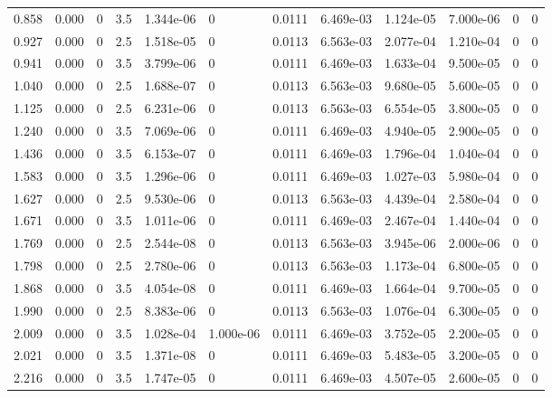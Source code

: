 \documentclass[preview]{standalone}
\begin{document}
{{\begin{tabular}{L{1.2cm}C{1.2cm} C{0.3cm}C{0.5cm} C{1.4cm}C{1.4cm} C{1.4cm}C{1.4cm} C{1.6cm}C{1.6cm} C{1.6cm}C{1.6cm}}
  0.858  &  0.000  & 0     & 3.5 &  1.344e-06  & 0  &  0.0111&   6.469e-03& 1.124e-05 & 7.000e-06   &  0 & 0  \\ 
  0.927  &  0.000  & 0     & 2.5 &  1.518e-05  & 0  &  0.0113&   6.563e-03& 2.077e-04 & 1.210e-04   &  0 & 0  \\ 
  0.941  &  0.000  & 0     & 3.5 &  3.799e-06  & 0  &  0.0111&   6.469e-03& 1.633e-04 & 9.500e-05   &  0 & 0  \\ 
  1.040  &  0.000  & 0     & 2.5 &  1.688e-07  & 0  &  0.0113&   6.563e-03& 9.680e-05 & 5.600e-05   &  0 & 0  \\ 
  1.125  &  0.000  & 0     & 2.5 &  6.231e-06  & 0  &  0.0113&   6.563e-03& 6.554e-05 & 3.800e-05   &  0 & 0  \\ 
  1.240  &  0.000  & 0     & 3.5 &  7.069e-06  & 0  &  0.0111&   6.469e-03& 4.940e-05 & 2.900e-05   &  0 & 0  \\ 
  1.436  &  0.000  & 0     & 3.5 &  6.153e-07  & 0  &  0.0111&   6.469e-03& 1.796e-04 & 1.040e-04   &  0 & 0  \\ 
  1.583  &  0.000  & 0     & 3.5 &  1.296e-06  & 0  &  0.0111&   6.469e-03& 1.027e-03 & 5.980e-04   &  0 & 0  \\ 
  1.627  &  0.000  & 0     & 2.5 &  9.530e-06  & 0  &  0.0113&   6.563e-03& 4.439e-04 & 2.580e-04   &  0 & 0  \\ 
  1.671  &  0.000  & 0     & 3.5 &  1.011e-06  & 0  &  0.0111&   6.469e-03& 2.467e-04 & 1.440e-04   &  0 & 0  \\ 
  1.769  &  0.000  & 0     & 2.5 &  2.544e-08  & 0  &  0.0113&   6.563e-03& 3.945e-06 & 2.000e-06   &  0 & 0  \\ 
  1.798  &  0.000  & 0     & 2.5 &  2.780e-06  & 0  &  0.0113&   6.563e-03& 1.173e-04 & 6.800e-05   &  0 & 0  \\ 
  1.868  &  0.000  & 0     & 3.5 &  4.054e-08  & 0  &  0.0111&   6.469e-03& 1.664e-04 & 9.700e-05   &  0 & 0  \\ 
  1.990  &  0.000  & 0     & 2.5 &  8.383e-06  & 0  &  0.0113&   6.563e-03& 1.076e-04 & 6.300e-05   &  0 & 0  \\ 
  2.009  &  0.000  & 0     & 3.5 &  1.028e-04  & 1.000e-06  &  0.0111&   6.469e-03& 3.752e-05 & 2.200e-05   &  0 & 0  \\ 
  2.021  &  0.000  & 0     & 3.5 &  1.371e-08  & 0  &  0.0111&   6.469e-03& 5.483e-05 & 3.200e-05   &  0 & 0  \\ 
  2.216  &  0.000  & 0     & 3.5 &  1.747e-05  & 0  &  0.0111&   6.469e-03& 4.507e-05 & 2.600e-05   &  0 & 0  \\ 

\end{tabular}}}
\end{document}
